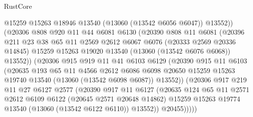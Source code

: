 \begin{lexlean}{RustCore}
\begin{coremodule}
                    @15259
                    @15263
                    @18946
                    @13540
                    (@13060 (@13542 @6056 @6047))
                    @13552))
                (@20306
                  @808
                  @920
                  @11
                  @44
                  @6081
                  @6130
                  (@20390
                    @808
                    @11
                    @6081
                    (@20396
                      @211
                      @23
                      @38
                      @65
                      @11
                      @2569
                      @2612
                      @6067
                      @6076
                      (@20333 @2569 @20336 @14845)
                      @15259
                      @15263
                      @19020
                      @13540
                      (@13060 (@13542 @6076 @6068))
                      @13552))
                  (@20306
                    @915
                    @919
                    @11
                    @41
                    @6103
                    @6129
                    (@20390
                      @915
                      @11
                      @6103
                      (@20635
                        @193
                        @65
                        @11
                        @4566
                        @2612
                        @6086
                        @6098
                        @20650
                        @15259
                        @15263
                        @19740
                        @13540
                        (@13060 (@13542 @6098 @6087))
                        @13552))
                    (@20306
                      @917
                      @219
                      @11
                      @27
                      @6127
                      @2577
                      (@20390
                        @917
                        @11
                        @6127
                        (@20635
                          @124
                          @65
                          @11
                          @2571
                          @2612
                          @6109
                          @6122
                          (@20645 @2571 @20648 @14862)
                          @15259
                          @15263
                          @19774
                          @13540
                          (@13060 (@13542 @6122 @6110))
                          @13552))
                      @20455)))))

\end{coremodule}
\end{lexlean}
